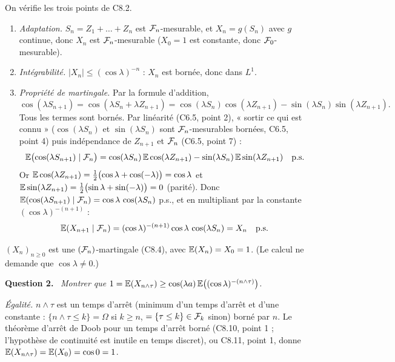 \documentclass[11pt,a4paper]{article}
\newcommand{\question}[1]{\par\medskip\noindent\textbf{Question #1.}~}
\begin{document}
\begin{exo}[{Martingale trigonométrique et sortie de $]
On vérifie les trois points de C8.2.
\begin{enumerate}[label=(\roman*)]
  \item \emph{Adaptation.} $S_n=Z_1+\dots+Z_n$ est $\F_n$-mesurable, et $X_n=g(S_n)$ avec $g$ continue, donc $X_n$ est
  $\F_n$-mesurable ($X_0=1$ est constante, donc $\F_0$-mesurable).
  \item \emph{Intégrabilité.} $|X_n|\le(\cos\lambda)^{-n}$ : $X_n$ est bornée, donc dans $L^1$.
  \item \emph{Propriété de martingale.} Par la formule d'addition,
  \[\cos(\lambda S_{n+1})=\cos(\lambda S_n+\lambda Z_{n+1})=\cos(\lambda S_n)\cos(\lambda Z_{n+1})-\sin(\lambda S_n)\sin(\lambda Z_{n+1}).\]
  Tous les termes sont bornés. Par linéarité (C6.5, point 2), « sortir ce qui est connu » ($\cos(\lambda S_n)$ et
  $\sin(\lambda S_n)$ sont $\F_n$-mesurables bornées, C6.5, point 4) puis indépendance de $Z_{n+1}$ et $\F_n$ (C6.5, point 7) :
  \[\E\bigl(\cos(\lambda S_{n+1})\mid\F_n\bigr)=\cos(\lambda S_n)\,\E\cos(\lambda Z_{n+1})-\sin(\lambda S_n)\,\E\sin(\lambda Z_{n+1})\quad\text{p.s.}\]
  Or $\E\cos(\lambda Z_{n+1})=\frac12\bigl(\cos\lambda+\cos(-\lambda)\bigr)=\cos\lambda$ et
  $\E\sin(\lambda Z_{n+1})=\frac12\bigl(\sin\lambda+\sin(-\lambda)\bigr)=0$ (parité). Donc
  $\E(\cos(\lambda S_{n+1})\mid\F_n)=\cos\lambda\,\cos(\lambda S_n)$ p.s., et en multipliant par la constante $(\cos\lambda)^{-(n+1)}$ :
  \[\E(X_{n+1}\mid\F_n)=(\cos\lambda)^{-(n+1)}\cos\lambda\,\cos(\lambda S_n)=X_n\quad\text{p.s.}\]
\end{enumerate}
\begin{resultat}
$(X_n)_{n\ge0}$ est une $(\F_n)$-martingale (C8.4), avec $\E(X_n)=X_0=1$. (Le calcul ne demande que $\cos\lambda\neq0$.)
\end{resultat}

\question{2} \emph{Montrer que $1=\mathbb{E}(X_{n\wedge\tau})\ge\cos(\lambda a)\,\mathbb{E}\bigl((\cos\lambda)^{-(n\wedge\tau)}\bigr)$.}

\emph{Égalité.} $n\wedge\tau$ est un temps d'arrêt (minimum d'un temps d'arrêt et d'une constante :
$\{n\wedge\tau\le k\}=\Omega$ si $k\ge n$, $=\{\tau\le k\}\in\mathcal{F}_k$ sinon) borné par $n$. Le théorème d'arrêt de Doob pour un
temps d'arrêt borné (C8.10, point 1 ; l'hypothèse de continuité est inutile en temps discret), ou C8.11, point 1, donne
$\mathbb{E}(X_{n\wedge\tau})=\mathbb{E}(X_0)=\cos 0=1$.


\end{exo}
\end{document}
